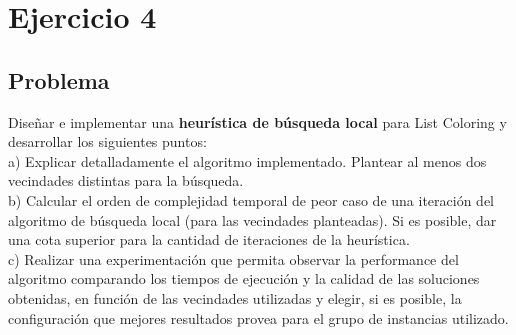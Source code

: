 \section{Ejercicio 4}
\subsection{Problema}
Dise\~nar e implementar una \textbf{heur\'istica de b\'usqueda local} para List Coloring y desarrollar los siguientes puntos:\\

a) Explicar detalladamente el algoritmo implementado. Plantear al menos dos vecindades distintas para la b\'usqueda.\\

b) Calcular el orden de complejidad temporal de peor caso de una iteraci\'on del algoritmo de b\'usqueda local (para las vecindades planteadas). Si es posible, dar una cota superior para la cantidad de iteraciones de la heur\'istica.\\

c) Realizar una experimentaci\'on que permita observar la performance del algoritmo comparando los tiempos de ejecuci\'on y la calidad de las soluciones obtenidas, en funci\'on de las vecindades utilizadas y elegir, si es posible, la configuraci\'on que mejores resultados provea para el grupo de instancias utilizado.\\

